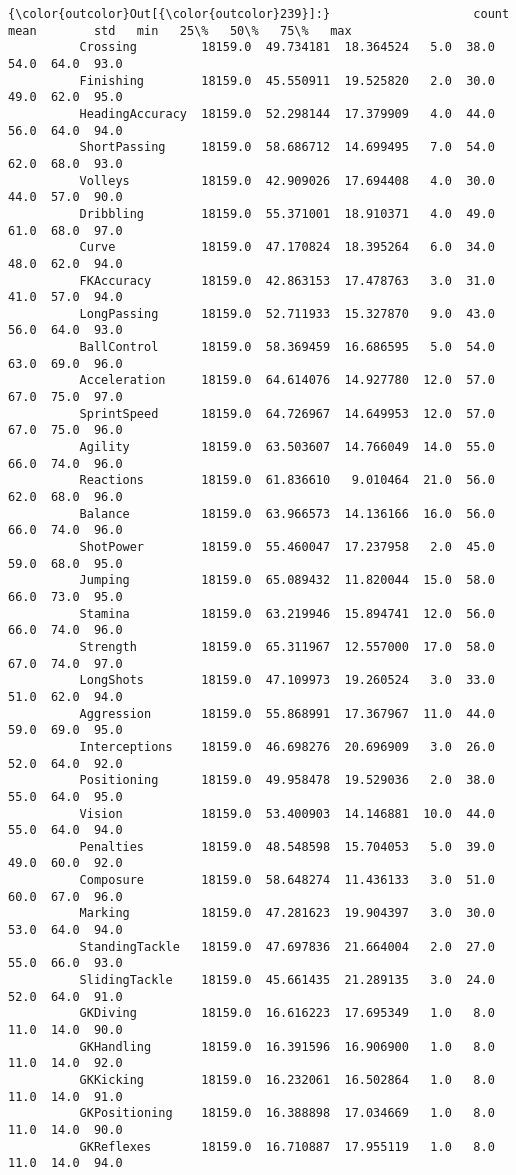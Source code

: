\documentclass[11pt]{article}
\begin{document}
\begin{Verbatim}[commandchars=\\\{\}]
{\color{outcolor}Out[{\color{outcolor}239}]:}                    count       mean        std   min   25\%   50\%   75\%   max
          Crossing         18159.0  49.734181  18.364524   5.0  38.0  54.0  64.0  93.0
          Finishing        18159.0  45.550911  19.525820   2.0  30.0  49.0  62.0  95.0
          HeadingAccuracy  18159.0  52.298144  17.379909   4.0  44.0  56.0  64.0  94.0
          ShortPassing     18159.0  58.686712  14.699495   7.0  54.0  62.0  68.0  93.0
          Volleys          18159.0  42.909026  17.694408   4.0  30.0  44.0  57.0  90.0
          Dribbling        18159.0  55.371001  18.910371   4.0  49.0  61.0  68.0  97.0
          Curve            18159.0  47.170824  18.395264   6.0  34.0  48.0  62.0  94.0
          FKAccuracy       18159.0  42.863153  17.478763   3.0  31.0  41.0  57.0  94.0
          LongPassing      18159.0  52.711933  15.327870   9.0  43.0  56.0  64.0  93.0
          BallControl      18159.0  58.369459  16.686595   5.0  54.0  63.0  69.0  96.0
          Acceleration     18159.0  64.614076  14.927780  12.0  57.0  67.0  75.0  97.0
          SprintSpeed      18159.0  64.726967  14.649953  12.0  57.0  67.0  75.0  96.0
          Agility          18159.0  63.503607  14.766049  14.0  55.0  66.0  74.0  96.0
          Reactions        18159.0  61.836610   9.010464  21.0  56.0  62.0  68.0  96.0
          Balance          18159.0  63.966573  14.136166  16.0  56.0  66.0  74.0  96.0
          ShotPower        18159.0  55.460047  17.237958   2.0  45.0  59.0  68.0  95.0
          Jumping          18159.0  65.089432  11.820044  15.0  58.0  66.0  73.0  95.0
          Stamina          18159.0  63.219946  15.894741  12.0  56.0  66.0  74.0  96.0
          Strength         18159.0  65.311967  12.557000  17.0  58.0  67.0  74.0  97.0
          LongShots        18159.0  47.109973  19.260524   3.0  33.0  51.0  62.0  94.0
          Aggression       18159.0  55.868991  17.367967  11.0  44.0  59.0  69.0  95.0
          Interceptions    18159.0  46.698276  20.696909   3.0  26.0  52.0  64.0  92.0
          Positioning      18159.0  49.958478  19.529036   2.0  38.0  55.0  64.0  95.0
          Vision           18159.0  53.400903  14.146881  10.0  44.0  55.0  64.0  94.0
          Penalties        18159.0  48.548598  15.704053   5.0  39.0  49.0  60.0  92.0
          Composure        18159.0  58.648274  11.436133   3.0  51.0  60.0  67.0  96.0
          Marking          18159.0  47.281623  19.904397   3.0  30.0  53.0  64.0  94.0
          StandingTackle   18159.0  47.697836  21.664004   2.0  27.0  55.0  66.0  93.0
          SlidingTackle    18159.0  45.661435  21.289135   3.0  24.0  52.0  64.0  91.0
          GKDiving         18159.0  16.616223  17.695349   1.0   8.0  11.0  14.0  90.0
          GKHandling       18159.0  16.391596  16.906900   1.0   8.0  11.0  14.0  92.0
          GKKicking        18159.0  16.232061  16.502864   1.0   8.0  11.0  14.0  91.0
          GKPositioning    18159.0  16.388898  17.034669   1.0   8.0  11.0  14.0  90.0
          GKReflexes       18159.0  16.710887  17.955119   1.0   8.0  11.0  14.0  94.0
\end{Verbatim}
            
\end{document}
